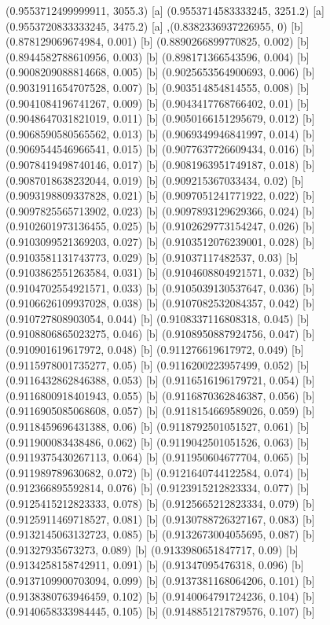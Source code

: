 {{{(0.9553712499999911, 3055.3) [a] 
(0.9553714583333245, 3251.2) [a] 
(0.9553720833333245, 3475.2) [a] 
},{(0.8382336937226955, 0) [b] 
(0.878129069674984, 0.001) [b] 
(0.8890266899770825, 0.002) [b] 
(0.8944582788610956, 0.003) [b] 
(0.898171366543596, 0.004) [b] 
(0.9008209088814668, 0.005) [b] 
(0.9025653564900693, 0.006) [b] 
(0.9031911654707528, 0.007) [b] 
(0.903514854814555, 0.008) [b] 
(0.9041084196741267, 0.009) [b] 
(0.9043417768766402, 0.01) [b] 
(0.9048647031821019, 0.011) [b] 
(0.9050166151295679, 0.012) [b] 
(0.9068590580565562, 0.013) [b] 
(0.9069349946841997, 0.014) [b] 
(0.9069544546966541, 0.015) [b] 
(0.9077637726609434, 0.016) [b] 
(0.9078419498740146, 0.017) [b] 
(0.9081963951749187, 0.018) [b] 
(0.9087018638232044, 0.019) [b] 
(0.909215367033434, 0.02) [b] 
(0.9093198809337828, 0.021) [b] 
(0.9097051241771922, 0.022) [b] 
(0.9097825565713902, 0.023) [b] 
(0.9097893129629366, 0.024) [b] 
(0.9102601973136455, 0.025) [b] 
(0.9102629773154247, 0.026) [b] 
(0.9103099521369203, 0.027) [b] 
(0.9103512076239001, 0.028) [b] 
(0.9103581131743773, 0.029) [b] 
(0.91037117482537, 0.03) [b] 
(0.9103862551263584, 0.031) [b] 
(0.9104608804921571, 0.032) [b] 
(0.9104702554921571, 0.033) [b] 
(0.9105039130537647, 0.036) [b] 
(0.9106626109937028, 0.038) [b] 
(0.9107082532084357, 0.042) [b] 
(0.910727808903054, 0.044) [b] 
(0.9108337116808318, 0.045) [b] 
(0.9108806865023275, 0.046) [b] 
(0.9108950887924756, 0.047) [b] 
(0.910901619617972, 0.048) [b] 
(0.911276619617972, 0.049) [b] 
(0.9115978001735277, 0.05) [b] 
(0.9116200223957499, 0.052) [b] 
(0.9116432862846388, 0.053) [b] 
(0.9116516196179721, 0.054) [b] 
(0.9116800918401943, 0.055) [b] 
(0.9116870362846387, 0.056) [b] 
(0.9116905085068608, 0.057) [b] 
(0.9118154669589026, 0.059) [b] 
(0.9118459696431388, 0.06) [b] 
(0.9118792501051527, 0.061) [b] 
(0.911900083438486, 0.062) [b] 
(0.9119042501051526, 0.063) [b] 
(0.9119375430267113, 0.064) [b] 
(0.911950604677704, 0.065) [b] 
(0.911989789630682, 0.072) [b] 
(0.9121640744122584, 0.074) [b] 
(0.912366895592814, 0.076) [b] 
(0.9123915212823334, 0.077) [b] 
(0.9125415212823333, 0.078) [b] 
(0.9125665212823334, 0.079) [b] 
(0.9125911469718527, 0.081) [b] 
(0.9130788726327167, 0.083) [b] 
(0.9132145063132723, 0.085) [b] 
(0.9132673004055695, 0.087) [b] 
(0.91327935673273, 0.089) [b] 
(0.9133980651847717, 0.09) [b] 
(0.9134258158742911, 0.091) [b] 
(0.91347095476318, 0.096) [b] 
(0.9137109900703094, 0.099) [b] 
(0.9137381168064206, 0.101) [b] 
(0.9138380763946459, 0.102) [b] 
(0.9140064791724236, 0.104) [b] 
(0.9140658333984445, 0.105) [b] 
(0.9148851217879576, 0.107) [b] 
}}}
